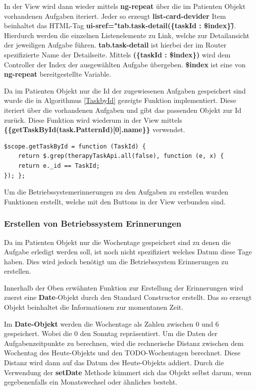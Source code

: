 In der View wird dann wieder mittels \textbf{ng-repeat} über die im Patienten Objekt vorhandenen Aufgaben iteriert. Jeder so erzeugt \textbf{list-card-devider} Item beinhaltet das HTML-Tag \textbf{ui-sref="tab.task-detail(\{taskId : \$index\})\"}. Hierdurch werden die einzelnen Listenelemente zu Link, welche zur Detailansicht der jeweiligen Aufgabe führen. \textbf{tab.task-detail} ist hierbei der im Router spezifizierte Name der Detailseite. Mittels \textbf{(\{taskId : \$index\})} wird dem Controller der Index der ausgewählten Aufgabe übergeben.
\textbf{\$index} ist eine von \textbf{ng-repeat} bereitgestellte Variable.

Da im Patienten Objekt nur die Id der zugewiesenen Aufgaben gespeichert sind wurde die in Algorithmus \ref{TaskbyId} gezeigte Funktion implementiert. Diese iteriert über die vorhandenen Aufgaben und gibt das passenden Objekt zur Id zurück. Diese Funktion wird wiederum in der View mittels \textbf{\{\{getTaskById(task.PatternId)[0].name\}\}} verwendet.

\begin{lstlisting}[caption={Funktion welche den Namen einer Aufgabe abhängig von der Id zurückliefert},label=TaskbyId]
$scope.getTaskById = function (TaskId) {
	return $.grep(therapyTaskApi.all(false), function (e, x) {
	return e._id == TaskId; 
}); };
\end{lstlisting}
Um die Betriebssystemerinnerungen zu den Aufgaben zu erstellen wurden Funktionen erstellt, welche mit den Buttons in der View verbunden sind.

\subsubsection{Erstellen von Betriebssystem Erinnerungen}\label{_ImpPCErinnerungen}
Da im Patienten Objekt nur die Wochentage gespeichert sind zu denen die Aufgabe erledigt werden soll, ist noch nicht spezifiziert welches Datum diese Tage haben. Dies wird jedoch benötigt um die Betriebssystem Erinnerungen zu erstellen.

Innerhalb der Oben erwähnten Funktion zur Erstellung der Erinnerungen wird zuerst eine \textbf{Date}-Objekt durch den Standard Constructor erstellt. Das so erzeugt Objekt beinhaltet die Informationen zur momentanen Zeit.

Im \textbf{Date-Objekt} werden die Wochentage als Zahlen zwischen 0 und 6 gespeichert. Wobei die 0 den Sonntag repräsentiert.
Um die Daten der Aufgabenzeitpunkte zu berechnen, wird die rechnerische Distanz zwischen dem Wochentag des Heute-Objekts und den TODO-Wochentagen berechnet.
Diese Distanz wird dann auf das Datum des Heute-Objekts addiert. Durch die Verwendung der \textbf{setDate} Methode kümmert sich das Objekt selbst darum, wenn gegebenenfalls ein Monatswechsel oder ähnliches besteht.

